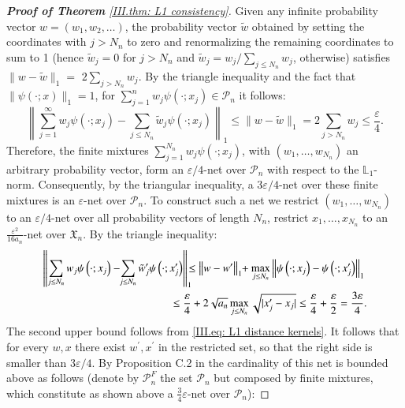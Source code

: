 \begin{proof}[\hypertarget{III.proof consistency in L1}{\textbf{Proof of Theorem} \ref{III.thm: L1 consistency}}]
Given any infinite probability vector $w=\left(w_1, w_2, \ldots\right)$, the probability vector $\tilde{w}$ obtained by setting the coordinates with $j>N_n$ to zero and renormalizing the remaining coordinates to sum to 1 (hence $\tilde{w}_j=0$ for $j>N_n$ and $\tilde{w}_j=w_j / \sum_{j \leq N_n} w_j$, otherwise) satisfies $\|w-\tilde{w}\|_1=$ $2 \sum_{j>N_n} w_j$. By the triangle inequality and the fact that $\|\psi(\cdot ; x)\|_1=1$, for $\sum_{j=1}^n w_j\psi\left(\cdot ; x_j\right) \in \mathcal{P}_n$ it follows:
$$
\left\|\sum_{j=1}^{\infty} w_j \psi\left(\cdot ; x_j\right)-\sum_{j \leq N_n} \tilde{w}_j \psi\left(\cdot ; x_j\right)\right\|_1 \leq\|w-\tilde{w}\|_1 = 2 \sum_{j>N_n} w_j \leq \frac{\varepsilon}{4}.
$$
Therefore, the finite mixtures $\sum_{j=1}^{N_n} w_j \psi\left(\cdot ; x_j\right)$, with $\left(w_1, \ldots, w_{N_n}\right)$ an arbitrary probability vector, form an $\varepsilon / 4$-net over $\mathcal{P}_n$ with respect to the $\mathbb{L}_1$-norm. Consequently, by the triangular inequality, a $3 \varepsilon / 4$-net over these finite mixtures is an $\varepsilon$-net over $\mathcal{P}_n$. To construct such a net we restrict $\left(w_1, \ldots, w_{N_n}\right)$ to an $\varepsilon / 4$-net over all probability vectors of length $N_n$, restrict $x_1,\ldots,x_{N_n}$ to an $\frac{\varepsilon^2}{16 a_n}$-net over $\mathfrak{X}_n$. By the triangle inequality:
\begin{align*}
\left\|\sum_{j \leq N_n} w_j \psi\left(\cdot ; x_j\right)- \hspace{-0.1cm} \sum_{j \leq N_n} \tilde{w}_j^{\prime} \psi\left(\cdot ; x_j^{\prime} \right)\right\|_1 &\hspace{-0.2cm} \leq\left\|w-w^{\prime}\right\|_1 \hspace{-0.1cm} +\max _{j \leq N_n}\left\|\psi\left(\cdot ; x_j\right)-\psi\left(\cdot ; x_j^{\prime}\right)\right\|_1 \\
& \hspace{-0.7cm} \leq \frac{\varepsilon}{4} + 2\sqrt{a_n} \max_{j \leq N_n} \sqrt{|x^{\prime}_j - x_j|} \leq \frac{\varepsilon}{4} + \frac{\varepsilon}{2} = \frac{3\varepsilon}{4}. 
\end{align*}
The second upper bound follows from \eqref{III.eq: L1 distance kernels}. It follows that for every $w, x$ there exist $w^{\prime}, x^{\prime}$ in the restricted set, so that the right side is smaller than $3 \varepsilon / 4$.  
By Proposition C.2 in \cite{4} the cardinality of this net is bounded above as follows (denote by $\mathcal{P}_n^{F}$ the set $\mathcal{P}_n$ but composed by finite mixtures, which constitute as shown above a $\frac{3}{4} \varepsilon$-net over $\mathcal{P}_n$):

\end{proof}

